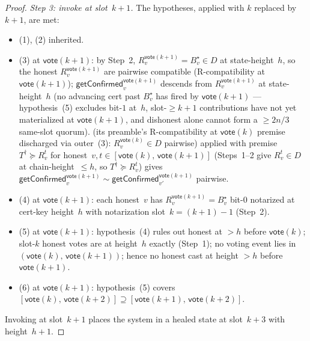 \documentclass{article}
\newcommand{\vote}{\mathsf{vote}}
\newcommand{\getConfirmed}{\textsf{getConfirmed}\xspace}
\theoremstyle{plain}
\theoremstyle{definition}
\theoremstyle{remark}
\begin{document}
\begin{proof}
\emph{Step 3: invoke  at slot~$k+1$.}
The hypotheses, applied with $k$ replaced by $k+1$, are met:
\begin{itemize}
  \item (1), (2) inherited.
  \item (3) at $\vote(k+1)$: by Step~2, $R_v^{\vote(k+1)} = B^\star_v \in D$ at state-height~$h$, so the honest $R_v^{\vote(k+1)}$ are pairwise compatible (R-compatibility at $\vote(k+1)$); $\getConfirmed_v^{\vote(k+1)}$ descends from $R_v^{\vote(k+1)}$ at state-height~$h$ (no advancing cert past $B^\star_v$ has fired by $\vote(k+1)$ — hypothesis~(5) excludes bit-$1$ at~$h$, slot-$\geq k+1$ contributions have not yet materialized at $\vote(k+1)$, and dishonest alone cannot form a $\geq 2n/3$ same-slot quorum).  (its preamble's R-compatibility at $\vote(k)$ premise discharged via outer~(3): $R_v^{\vote(k)} \in D$ pairwise) applied with premise $T^\dagger \succeq R_v^t$ for honest~$v, t \in [\vote(k),\, \vote(k+1)]$ (Steps~1--2 give $R_v^t \in D$ at chain-height~$\leq h$, so $T^\dagger \succeq R_v^t$) gives $\getConfirmed_v^{\vote(k+1)} \sim \getConfirmed_{v'}^{\vote(k+1)}$ pairwise.
  \item (4) at $\vote(k+1)$: each honest~$v$ has $R_v^{\vote(k+1)} = B^\star_v$ bit-$0$ notarized at cert-key height~$h$ with notarization slot~$k = (k+1)-1$ (Step~2).
  \item (5) at $\vote(k+1)$: hypothesis~(4) rules out honest at $>h$ before $\vote(k)$; slot-$k$ honest votes are at height~$h$ exactly (Step~1); no voting event lies in $(\vote(k),\, \vote(k+1))$; hence no honest cast at height $>h$ before $\vote(k+1)$.
  \item (6) at $\vote(k+1)$: hypothesis~(5) covers $[\vote(k),\, \vote(k+2)] \supseteq [\vote(k+1),\, \vote(k+2)]$.
\end{itemize}
Invoking  at slot~$k+1$ places the system in a healed state at slot~$k+3$ with height~$h+1$.
\end{proof}
\end{document}
